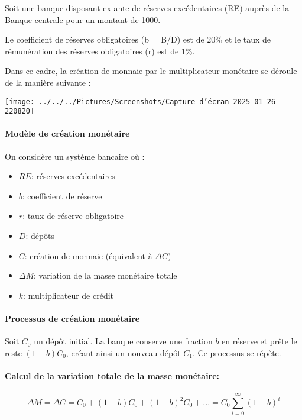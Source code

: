 \documentclass[a4paper, 12pt]{report}
\begin{document}
Soit une banque disposant ex-ante de réserves excédentaires (RE) auprès de la Banque centrale pour un montant de 1000.

Le coefficient de réserves obligatoires (b = B/D) est de 20\% et le taux de rémunération des réserves obligatoires (r) est de 1\%.

Dans ce cadre, la création de monnaie par le multiplicateur monétaire se déroule de la manière suivante :
\begin{center}
	
\texttt{[image: ../../../Pictures/Screenshots/Capture d'écran 2025-01-26 220820]}
	
\end{center}
	
\paragraph{Modèle de création monétaire}

On considère un système bancaire où :
\begin{itemize}
	\item $RE$: réserves excédentaires
	\item $b$: coefficient de réserve
	\item $r$: taux de réserve obligatoire
	\item $D$: dépôts
	\item $C$: création de monnaie (équivalent à $\Delta C$)
	\item $\Delta M$: variation de la masse monétaire totale
	\item $k$: multiplicateur de crédit
\end{itemize}

\paragraph{Processus de création monétaire}

Soit $C_0$ un dépôt initial. La banque conserve une fraction $b$ en réserve et prête le reste $(1-b)C_0$, créant ainsi un nouveau dépôt $C_1$. Ce processus se répète.

\paragraph{Calcul de la variation totale de la masse monétaire:}

$$\Delta M = \Delta C = C_0 + (1-b)C_0 + (1-b)^2C_0 + ... = C_0 \sum_{i=0}^{\infty} (1-b)^i$$
\end{document}
